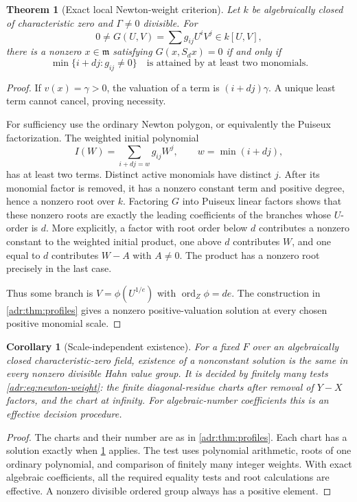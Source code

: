 \documentclass[11pt,letterpaper]{article}
\numberwithin{equation}{section}
\newtheorem{theorem}{Theorem}[section]
\newtheorem{corollary}[corollary]{Corollary}
\theoremstyle{definition}
\theoremstyle{remark}
\newcommand{\ord}{\operatorname{ord}}
\begin{document}
\begin{theorem}[Exact local Newton-weight criterion]\label{adr:thm:newton}
Let $k$ be algebraically closed of characteristic zero and $\Gamma\ne0$
divisible. For
\[
 0\ne G(U,V)=\sum g_{ij}U^iV^j\in k[U,V],
\]
there is a nonzero $x\in\mathfrak m$ satisfying $G(x,S_dx)=0$ if and only if
\begin{equation}\label{adr:eq:newton-weight}
 \min\{i+dj:g_{ij}\ne0\}
 \quad\text{is attained by at least two monomials.}
\end{equation}
\end{theorem}
\begin{proof}
If $v(x)=\gamma>0$, the valuation of a term is $(i+dj)\gamma$.
A unique least term cannot cancel, proving necessity.

For sufficiency use the ordinary Newton polygon, or equivalently the
Puiseux factorization. The weighted initial polynomial
\[
 I(W)=\sum_{i+dj=w}g_{ij}W^j,
 \qquad w=\min(i+dj),
\]
has at least two terms. Distinct active monomials have distinct $j$.
After its monomial factor is removed, it has a nonzero constant term and
positive degree, hence a nonzero root over $k$.
Factoring $G$ into Puiseux linear factors shows that these nonzero roots
are exactly the leading coefficients of the branches whose $U$-order is
$d$. More explicitly, a factor with root order below $d$ contributes a
nonzero constant to the weighted initial product, one above $d$ contributes
$W$, and one equal to $d$ contributes $W-A$ with $A\ne0$. The product
has a nonzero root precisely in the last case.

Thus some branch is $V=\phi(U^{1/e})$ with $\ord_Z\phi=de$.
The construction in \cref{adr:thm:profiles} gives a nonzero positive-valuation
solution at every chosen positive monomial scale.
\end{proof}

\begin{corollary}[Scale-independent existence]\label{adr:cor:existence}
For a fixed $F$ over an algebraically closed characteristic-zero field,
existence of a nonconstant solution is the same in every nonzero divisible
Hahn value group. It is decided by finitely many tests
\eqref{adr:eq:newton-weight}: the finite diagonal-residue charts after removal
of $Y-X$ factors, and the chart at infinity. For algebraic-number
coefficients this is an effective decision procedure.
\end{corollary}
\begin{proof}
The charts and their number are as in \cref{adr:thm:profiles}.
Each chart has a solution exactly when \cref{adr:thm:newton} applies.
The test uses polynomial arithmetic, roots of one ordinary polynomial,
and comparison of finitely many integer weights. With exact algebraic
coefficients, all the required equality tests and root calculations are
effective. A nonzero divisible ordered group always has a positive element.
\end{proof}
\end{document}
